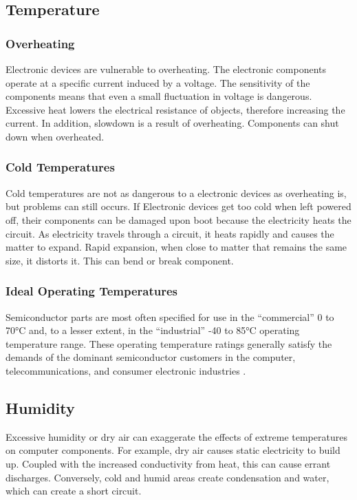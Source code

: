 \subsection{Temperature}
\subsubsection{Overheating}
Electronic devices are vulnerable to overheating. The electronic components operate at a specific current induced by a voltage. The sensitivity of the components means that even a small fluctuation in voltage is dangerous. Excessive heat lowers the electrical resistance of objects, therefore increasing the current. In addition, slowdown is a result of overheating. Components can shut down when overheated.

\subsubsection{Cold Temperatures}
Cold temperatures are not as dangerous to a electronic devices as overheating is, but problems can still occurs. If Electronic devices get too cold when left powered off, their components can be damaged upon boot because the electricity heats the circuit. As electricity travels through a circuit, it heats rapidly and causes the matter to expand. Rapid expansion, when close to matter that remains the same size, it distorts it. This can bend or break component.

\subsubsection{Ideal Operating Temperatures}
Semiconductor parts are most often specified for use in the “commercial” 0 to 70°C and, to a lesser extent, in the “industrial” -40 to 85°C operating temperature range. These operating temperature ratings generally satisfy the demands of the dominant semiconductor customers in the computer, telecommunications, and consumer electronic industries \cite{Mishra2004}.

\subsection{Humidity}
Excessive humidity or dry air can exaggerate the effects of extreme temperatures on computer components. For example, dry air causes static electricity to build up. Coupled with the increased conductivity from heat, this can cause errant discharges. Conversely, cold and humid areas create condensation and water, which can create a short circuit.

